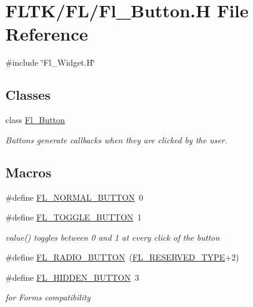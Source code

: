 \hypertarget{_fl___button_8_h}{}\section{F\+L\+T\+K/\+F\+L/\+Fl\+\_\+\+Button.H File Reference}
\label{_fl___button_8_h}
{\ttfamily \#include \char`\"{}Fl\+\_\+\+Widget.\+H\char`\"{}}\newline
\subsection*{Classes}
\begin{DoxyCompactItemize}
\item 
class \hyperlink{class_fl___button}{Fl\+\_\+\+Button}
\begin{DoxyCompactList}\small\item\em Buttons generate callbacks when they are clicked by the user. \end{DoxyCompactList}\end{DoxyCompactItemize}
\subsection*{Macros}
\begin{DoxyCompactItemize}
\item 
\#define \hyperlink{_fl___button_8_h_aa6c0d9d14d04aad8aa41289e7b8aa588}{F\+L\+\_\+\+N\+O\+R\+M\+A\+L\+\_\+\+B\+U\+T\+T\+ON}~0
\item 
\#define \hyperlink{_fl___button_8_h_a5afdb5adfef9c1555b5a4165c5404cc1}{F\+L\+\_\+\+T\+O\+G\+G\+L\+E\+\_\+\+B\+U\+T\+T\+ON}~1
\begin{DoxyCompactList}\small\item\em value() toggles between 0 and 1 at every click of the button \end{DoxyCompactList}\item 
\#define \hyperlink{_fl___button_8_h_aa2d288c51fe96434d1d163a9fa49c33c}{F\+L\+\_\+\+R\+A\+D\+I\+O\+\_\+\+B\+U\+T\+T\+ON}~(\hyperlink{_fl___widget_8_h_ad300ac1cbbe7744c87fc376ce0eb9cc7}{F\+L\+\_\+\+R\+E\+S\+E\+R\+V\+E\+D\+\_\+\+T\+Y\+PE}+2)
\item 
\#define \hyperlink{_fl___button_8_h_aefb893509f5b5834310f2004fdde4d17}{F\+L\+\_\+\+H\+I\+D\+D\+E\+N\+\_\+\+B\+U\+T\+T\+ON}~3
\begin{DoxyCompactList}\small\item\em for Forms compatibility \end{DoxyCompactList}\end{DoxyCompactItemize}

